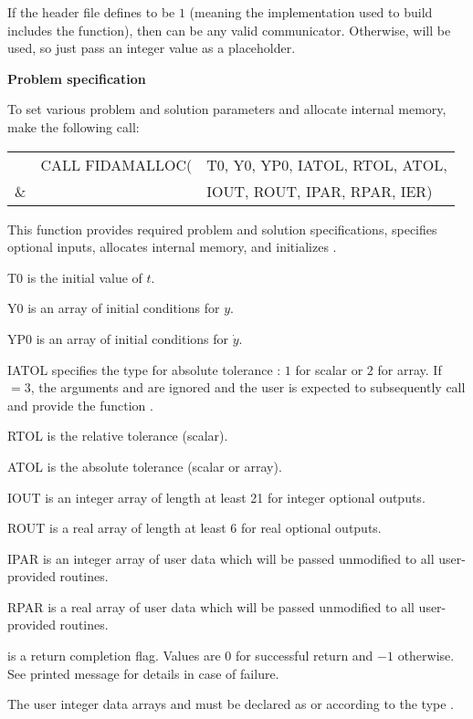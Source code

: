 \begin{Steps}
  {\warn}If the header file  defines
   to be $1$ (meaning the {\mpi}
  implementation used to build {\sundials} includes the
   function), then  can be any valid
  {\mpi} communicator. Otherwise,  will be used, so
  just pass an integer value as a placeholder.

\item {\bf Problem specification}

  To set various problem and solution parameters and allocate
  internal memory, make the following call:
  {
    \begin{tabular}[t]{@{}r@{}l@{}l}
        &CALL FIDAMALLOC(&T0, Y0, YP0, IATOL, RTOL, ATOL,  \\
    {\&}&                &IOUT, ROUT, IPAR, RPAR, IER)
  \end{tabular}
  }
  {
    This function provides required problem and solution specifications, 
    specifies optional inputs,
    allocates internal memory, and initializes {\ida}.
  }
  {
    \begin{args}[IATOL]
    \item[T0] is the initial value of $t$.
    \item[Y0] is an array of initial conditions for $y$.
    \item[YP0] is an array of initial conditions for $\dot{y}$.
    \item[IATOL] specifies the type for absolute tolerance :
      $1$ for scalar or $2$ for array. If $=3$, the arguments
       and  are ignored and the user is expected to
      subsequently call  and provide the function .
    \item[RTOL] is the relative tolerance (scalar).
    \item[ATOL] is the absolute tolerance (scalar or array).
    \item[IOUT] is an integer array of length at least 21 for integer optional
                outputs.
    \item[ROUT] is a real array of length at least 6 for real optional outputs.
    \item[IPAR] is an integer array of user data which will be passed
      unmodified to all user-provided routines.
    \item[RPAR] is a real array of user data which will be passed
      unmodified to all user-provided routines.
    \end{args}
  }
  {
     is a return completion flag.  Values are $0$ for successful return
    and $-1$ otherwise. See printed message for details in case of failure.
  }
  {
    The user integer data arrays  and  must be declared as
     or  according to the {\C} type .

}
\end{Steps}
